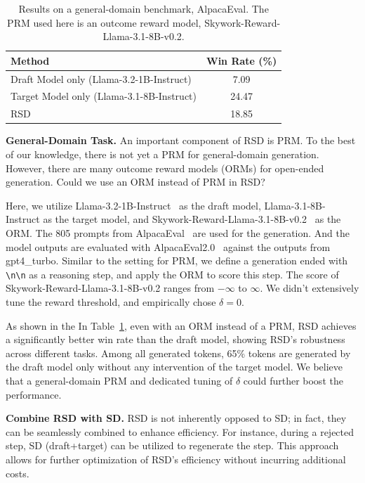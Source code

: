 \documentclass{article}
\theoremstyle{plain}
\theoremstyle{definition}
\theoremstyle{remark}
\begin{document}
\begin{table}[t]
\caption{Results on a general-domain benchmark, AlpacaEval. The PRM used here is an outcome reward model, Skywork-Reward-Llama-3.1-8B-v0.2.}
\label{tab:general_domain}
\vskip 0.1in
\small
\begin{center}
\begin{tabular}{lc} 
\toprule
\textbf{Method} & \textbf{Win Rate (\%)} \\
\midrule
Draft Model only (Llama-3.2-1B-Instruct) & 7.09 \\
Target Model only (Llama-3.1-8B-Instruct) & 24.47 \\
\rowcolor{blue!8}
RSD & 18.85 \\
\bottomrule
\end{tabular}
\end{center}
\vskip -0.1in
\vspace{-1em}
\end{table}

\textbf{General-Domain Task.} An important component of RSD is PRM. To the best of our knowledge, there is not yet a PRM for general-domain generation. However, there are many outcome reward models (ORMs) for open-ended generation. Could we use an ORM instead of PRM in RSD?

Here, we utilize Llama-3.2-1B-Instruct~\citep{grattafiori2024llama} as the draft model, Llama-3.1-8B-Instruct as the target model, and Skywork-Reward-Llama-3.1-8B-v0.2~\citep{liu2024skywork} as the ORM. The 805 prompts from AlpacaEval~\citep{dubois2023alpacafarm} are used for the generation. And the model outputs are evaluated with AlpacaEval2.0~\citep{alpaca_eval} against the outputs from gpt4\_turbo. Similar to the setting for PRM, we define a generation ended with \texttt{\textbackslash n\textbackslash n} as a reasoning step, and apply the ORM to score this step. The score of Skywork-Reward-Llama-3.1-8B-v0.2 ranges from $-\infty$ to $\infty$. We didn't extensively tune the reward threshold, and empirically chose $\delta=0$.

As shown in the In Table~\ref{tab:general_domain}, even with an ORM instead of a PRM, RSD achieves a significantly better win rate than the draft model, showing RSD's robustness across different tasks. Among all generated tokens, 65\% tokens are generated by the draft model only without any intervention of the target model. We believe that a general-domain PRM and dedicated tuning of $\delta$ could further boost the performance.

\textbf{Combine RSD with SD.} RSD is not inherently opposed to SD; in fact, they can be seamlessly combined to enhance efficiency. For instance, during a rejected step, SD (draft+target) can be utilized to regenerate the step. This approach allows for further optimization of RSD's efficiency without incurring additional costs.
\end{document}
